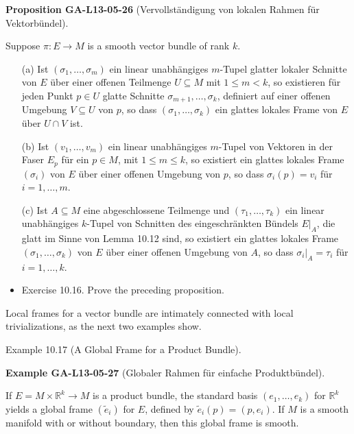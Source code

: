 \documentclass[10pt, letterpaper]{article}
\newcommand{\CustomHeading}[3]{%
  \par\medskip\noindent%
  \textbf{#1 #2} \textnormal{(#3)}.\enskip%
}
\newenvironment{PROP}[2]{\begin{unitbox}\CustomHeading{Proposition}{#1}{#2}}{\end{unitbox}}
\newenvironment{EXA}[2]{\begin{unitbox}\CustomHeading{Example}{#1}{#2}}{\end{unitbox}}
\begin{document}
\begin{PROP}{GA-L13-05-26}{Vervollständigung von lokalen Rahmen für Vektorbündel}
Suppose $\pi: E \rightarrow M$ is a smooth vector bundle of rank $k$.\\
\begin{itemize}
  \item[(a)] Ist \( (\sigma_1, \ldots, \sigma_m) \) ein linear unabhängiges \( m \)-Tupel glatter lokaler Schnitte von \( E \) über einer offenen Teilmenge \( U \subseteq M \) mit \( 1 \leq m < k \), so existieren für jeden Punkt \( p \in U \) glatte Schnitte \( \sigma_{m+1}, \ldots, \sigma_k \), definiert auf einer offenen Umgebung \( V \subseteq U \) von \( p \), so dass \( (\sigma_1, \ldots, \sigma_k) \) ein glattes lokales Frame von \( E \) über \( U \cap V \) ist.

  \item[(b)] Ist \( (v_1, \ldots, v_m) \) ein linear unabhängiges \( m \)-Tupel von Vektoren in der Faser \( E_p \) für ein \( p \in M \), mit \( 1 \leq m \leq k \), so existiert ein glattes lokales Frame \( (\sigma_i) \) von \( E \) über einer offenen Umgebung von \( p \), so dass \( \sigma_i(p) = v_i \) für \( i = 1, \ldots, m \).

  \item[(c)] Ist \( A \subseteq M \) eine abgeschlossene Teilmenge und \( (\tau_1, \ldots, \tau_k) \) ein linear unabhängiges \( k \)-Tupel von Schnitten des eingeschränkten Bündels \( E|_A \), die glatt im Sinne von Lemma 10.12 sind, so existiert ein glattes lokales Frame \( (\sigma_1, \ldots, \sigma_k) \) von \( E \) über einer offenen Umgebung von \( A \), so dass \( \sigma_i|_A = \tau_i \) für \( i = 1, \ldots, k \).
\end{itemize}
\end{PROP}


\begin{itemize}
  \item Exercise 10.16. Prove the preceding proposition.
\end{itemize}

Local frames for a vector bundle are intimately connected with local trivializations, as the next two examples show.


Example 10.17 (A Global Frame for a Product Bundle). 


\begin{EXA}{GA-L13-05-27}{Globaler Rahmen für einfache Produktbündel}
If $E=M \times \mathbb{R}^{k} \rightarrow M$ is a product bundle, the standard basis $\left(e_{1}, \ldots, e_{k}\right)$ for $\mathbb{R}^{k}$ yields a global frame $\left(\tilde{e}_{i}\right)$ for $E$, defined by $\tilde{e}_{i}(p)=\left(p, e_{i}\right)$. If $M$ is a smooth manifold with or without boundary, then this global frame is smooth.
\end{EXA}
\end{document}
